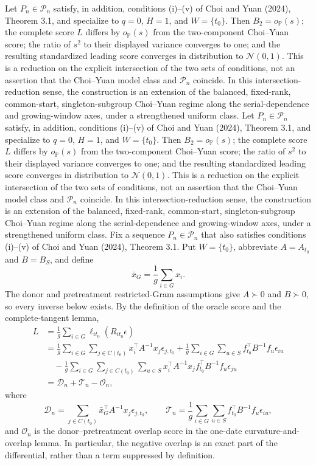 Let \(P_n\in\mathcal P_n\) satisfy, in addition, conditions (i)--(v) of Choi and Yuan (2024), Theorem 3.1, and specialize to \(q=0\), \(H=1\), and \(W=\{t_0\}\). Then \(B_2=o_{\mathbb P}(s)\); the complete score \(L\) differs by \(o_{\mathbb P}(s)\) from the two-component Choi--Yuan score; the ratio of \(s^2\) to their displayed variance converges to one; and the resulting standardized leading score converges in distribution to \(\mathcal N(0,1)\). This is a reduction on the explicit intersection of the two sets of conditions, not an assertion that the Choi--Yuan model class and \(\mathcal P_n\) coincide. In this intersection-reduction sense, the construction is an extension of the balanced, fixed-rank, common-start, singleton-subgroup Choi--Yuan regime along the serial-dependence and growing-window axes, under a strengthened uniform class.
Let \(P_n\in\mathcal P_n\) satisfy, in addition, conditions (i)--(v) of Choi and Yuan (2024), Theorem 3.1, and specialize to \(q=0\), \(H=1\), and \(W=\{t_0\}\). Then \(B_2=o_{\mathbb P}(s)\); the complete score \(L\) differs by \(o_{\mathbb P}(s)\) from the two-component Choi--Yuan score; the ratio of \(s^2\) to their displayed variance converges to one; and the resulting standardized leading score converges in distribution to \(\mathcal N(0,1)\). This is a reduction on the explicit intersection of the two sets of conditions, not an assertion that the Choi--Yuan model class and \(\mathcal P_n\) coincide. In this intersection-reduction sense, the construction is an extension of the balanced, fixed-rank, common-start, singleton-subgroup Choi--Yuan regime along the serial-dependence and growing-window axes, under a strengthened uniform class.
Fix a sequence \(P_n\in\mathcal P_n\) that also satisfies conditions (i)--(v) of Choi and Yuan (2024), Theorem 3.1.  Put \(W=\{t_0\}\), abbreviate \(A=A_{t_0}\) and \(B=B_S\), and define
\[
 \bar x_G=\frac1g\sum_{i\in G}x_i.
\]
The donor and pretreatment restricted-Gram assumptions give \(A\succ0\) and \(B\succ0\), so every inverse below exists.  By the definition of the oracle score and the complete-tangent lemma,
\[
 \begin{aligned}
 L
 &=\frac1g\sum_{i\in G}\ell_{i t_0}(R_{i t_0}\epsilon)\\
 &=\frac1g\sum_{i\in G}\sum_{j\in C(t_0)}
       x_i^{\top}A^{-1}x_j\epsilon_{j,t_0}
   +\frac1g\sum_{i\in G}\sum_{u\in S}
       f_{t_0}^{\top}B^{-1}f_u\epsilon_{iu}\\
 &\quad
   -\frac1g\sum_{i\in G}\sum_{j\in C(t_0)}\sum_{u\in S}
       x_i^{\top}A^{-1}x_j
       f_{t_0}^{\top}B^{-1}f_u\epsilon_{ju}\\
 &=\mathcal D_n+\mathcal T_n-\mathcal O_n,
 \end{aligned}
\]
where
\[
 \mathcal D_n
 =\sum_{j\in C(t_0)}\bar x_G^{\top}A^{-1}x_j\epsilon_{j,t_0},
 \qquad
 \mathcal T_n
 =\frac1g\sum_{i\in G}\sum_{u\in S}
       f_{t_0}^{\top}B^{-1}f_u\epsilon_{iu},
\]
and \(\mathcal O_n\) is the donor--pretreatment overlap score in the one-date curvature-and-overlap lemma.  In particular, the negative overlap is an exact part of the differential, rather than a term suppressed by definition.

